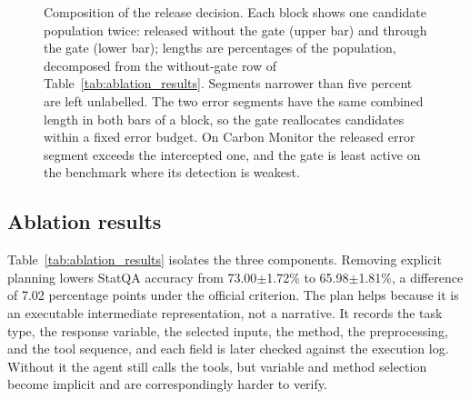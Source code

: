 \documentclass[preprint,12pt,authoryear]{elsarticle}
\begin{document}
\begin{figure}[t]
\caption{Composition of the release decision. Each block shows one candidate population twice: released without the gate (upper bar) and through the gate (lower bar); lengths are percentages of the population, decomposed from the without-gate row of Table~\ref{tab:ablation_results}. Segments narrower than five percent are left unlabelled. The two error segments have the same combined length in both bars of a block, so the gate reallocates candidates within a fixed error budget. On Carbon Monitor the released error segment exceeds the intercepted one, and the gate is least active on the benchmark where its detection is weakest.}
\label{fig:candidate_routing}
\end{figure}

\subsection{Ablation results}
\label{sec:results_ablation}

Table~\ref{tab:ablation_results} isolates the three components.
Removing explicit planning lowers StatQA accuracy from 73.00$\pm$1.72\% to 65.98$\pm$1.81\%, a difference of 7.02 percentage points under the official criterion.
The plan helps because it is an executable intermediate representation, not a narrative.
It records the task type, the response variable, the selected inputs, the method, the preprocessing, and the tool sequence, and each field is later checked against the execution log.
Without it the agent still calls the tools, but variable and method selection become implicit and are correspondingly harder to verify.
\end{document}
